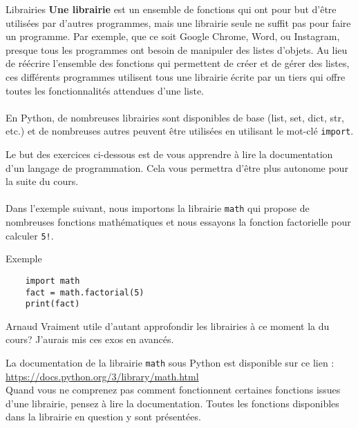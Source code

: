 \begin{section}{Librairies}
    \textbf{Une librairie} est un ensemble de fonctions qui ont pour but d'être utilisées par d'autres programmes, mais une librairie seule ne suffit pas pour faire un programme. Par exemple, que ce soit Google Chrome, Word, ou Instagram, presque tous les programmes ont besoin de manipuler des listes d'objets. Au lieu de réécrire l'ensemble des fonctions qui permettent de créer et de gérer des listes, ces différents programmes utilisent tous une librairie écrite par un tiers qui offre toutes les fonctionnalités attendues d'une liste.
\\\\
En Python, de nombreuses librairies sont disponibles de base (list, set, dict, str, etc.) et de nombreuses autres peuvent être utilisées en utilisant le mot-clé \lstinline{import}.

Le but des exercices ci-dessous est de vous apprendre à lire la documentation d'un langage de programmation. Cela vous permettra d'être plus autonome pour la suite du cours.
\\\\
Dans l'exemple suivant, nous importons la librairie \lstinline{math} qui propose de nombreuses fonctions mathématiques et nous essayons la fonction factorielle pour calculer \lstinline{5!}.
\begin{Example}{\faTerminal Exemple}
    \begin{lstlisting}
    import math
    fact = math.factorial(5)
    print(fact)\end{lstlisting}
\end{Example}
\begin{note}{Arnaud}
    Vraiment utile d'autant approfondir les librairies à ce moment la du cours? J'aurais mis ces exos en avancés.
    \end{note}

\begin{conseil}
	La documentation de la librairie \lstinline{math} sous Python est disponible sur ce lien : \url{https://docs.python.org/3/library/math.html} \\
Quand vous ne comprenez pas comment fonctionnent certaines fonctions issues d'une librairie, pensez à lire la documentation. Toutes les fonctions disponibles dans la librairie en question y sont présentées.


\end{conseil}
\end{section}
